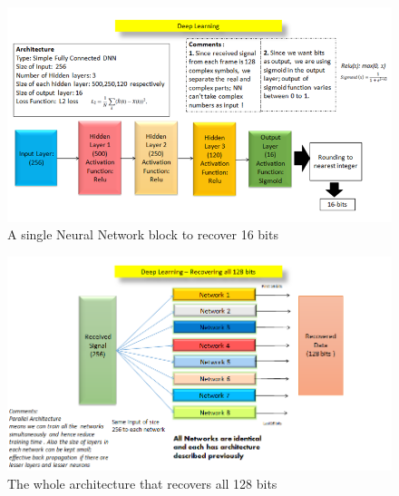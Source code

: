 \begin{figure}[htbp]
  \centering
  \includegraphics[width=\textwidth]{./Figures/comm_16_bit.png}
  \caption{A single Neural Network block to recover 16 bits}
  \label{fig:comm_16_bit}
\end{figure}
\begin{figure}[htbp]
  \centering
  \includegraphics[width=\textwidth]{./Figures/comm_128_bit.png}
  \caption{The whole architecture that recovers all 128 bits}
  \label{fig:comm_128_bit}
\end{figure}
